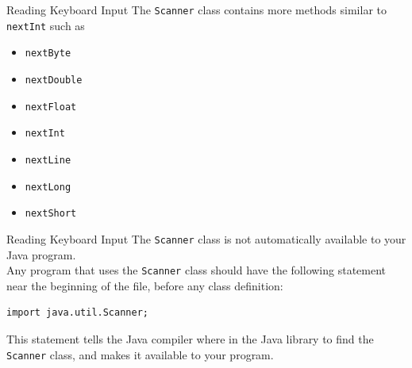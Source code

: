 \documentclass[11pt]{beamer}
\begin{document}
\begin{frame}[fragile]{Reading Keyboard Input}
    The \texttt{Scanner} class contains more methods similar to \texttt{nextInt} such as
    \begin{itemize}
        \item \texttt{nextByte}
        \item \texttt{nextDouble}
        \item \texttt{nextFloat}
        \item \texttt{nextInt}
        \item \texttt{nextLine}
        \item \texttt{nextLong}
        \item \texttt{nextShort}
    \end{itemize}
\end{frame}

\begin{frame}[fragile]{Reading Keyboard Input}
    The \texttt{Scanner} class is not automatically available to your Java program. \\ \vspace{1em}
    Any program that uses the \texttt{Scanner} class should have the following statement near the beginning of the file, before any class definition:
    \begin{lstlisting}
import java.util.Scanner;
    \end{lstlisting}
This statement tells the Java compiler where in the Java library to find the \texttt{Scanner} class, and makes it available to your program.
\end{frame}
\end{document}
